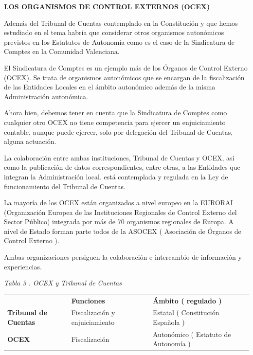 \documentclass[
]{article}
\begin{document}
\textbf{LOS ORGANISMOS DE CONTROL EXTERNOS (OCEX)}

Además del Tribunal de Cuentas contemplado en la Constitución y que
hemos estudiado en el tema habría que considerar otros organismos
autonómicos previstos en los Estatutos de Autonomía como es el caso de
la Sindicatura de Comptes en la Comunidad Valenciana.

El Síndicatura de Comptes es un ejemplo más de los Órganos de Control
Externo (OCEX). Se trata de organismos autonómicos que se encargan de la
fiscalización de las Entidades Locales en el ámbito autonómico además de
la misma Administración autonómica.

Ahora bien, debemos tener en cuenta que la Sindicatura de Comptes como
cualquier otro OCEX no tiene competencia para ejercer un enjuiciamiento
contable, aunque puede ejercer, solo por delegación del Tribunal de
Cuentas, alguna actuación.

La colaboración entre ambas instituciones, Tribunal de Cuentas y OCEX,
así como la publicación de datos correspondientes, entre otras, a las
Entidades que integran la Administración local. está contemplada y
regulada en la Ley de funcionamiento del Tribunal de Cuentas.

La mayoría de los OCEX están organizados a nivel europeo en la EURORAI
(Organización Europea de las Instituciones Regionales de Control Externo
del Sector Público) integrada por más de 70 organismos regionales de
Europa. A nivel de Estado forman parte todos de la ASOCEX ( Asociación
de Órganos de Control Externo ).

Ambas organizaciones persiguen la colaboración e intercambio de
información y experiencias.

\emph{Tabla 3 . OCEX y Tribunal de Cuentas}

\begin{longtable}[]{@{}
  >{\raggedright\arraybackslash}p{}
  >{\raggedright\arraybackslash}p{}
  >{\raggedright\arraybackslash}p{}@{}}
\toprule\noalign{}
\endhead
\bottomrule\noalign{}
\endlastfoot
& \textbf{Funciones} & \textbf{Ámbito ( regulado )} \\
\textbf{Tribunal de Cuentas} & Fiscalización y enjuiciamiento & Estatal
( Constitución Española ) \\
\textbf{OCEX} & Fiscalización & Autonómico ( Estatuto de Autonomía ) \\
\end{longtable}
\end{document}

